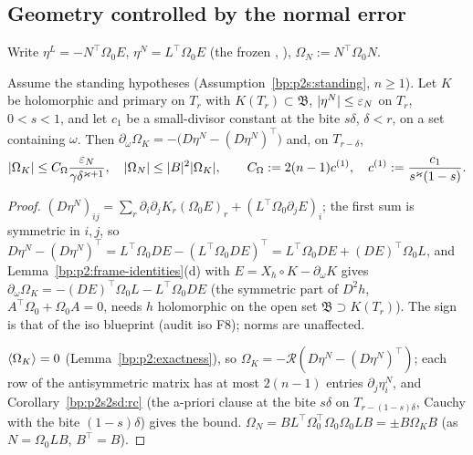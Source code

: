 \subsection{Geometry controlled by the normal error}\label{bp:p2s2:sec-geo}

Write $\eta^L=-N^\top\Omega_0E$, $\eta^N=L^\top\Omega_0E$ (the frozen , ), $\Omega_N:=N^\top\Omega_0N$.

\begin{lemma}\label{bp:p2s2:omega}
Assume the standing hypotheses (Assumption~\ref{bp:p2s:standing}, $n\ge1$). Let $K$ be holomorphic and primary on $T_r$ with $K(T_r)\subset\mathfrak B$,
$\lvert \eta^N\rvert\le\varepsilon_N$ on $T_r$, $0<s<1$, and let $c_1$ be a small-divisor constant at the bite $s\delta$, $\delta<r$, on a set containing
$\omega$. Then $\partial_\omega\Omega_K=-\bigl(D\eta^N-(D\eta^N)^\top\bigr)$ and, on $T_{r-\delta}$,
\[
\lvert \Omega_K\rvert\le C_\Omega\frac{\varepsilon_N}{\gamma\delta^{\varkappa+1}},\quad\lvert \Omega_N\rvert\le\lvert B\rvert^2\lvert \Omega_K\rvert,\qquad C_\Omega:=2(n-1)c^{(1)},\quad
c^{(1)}:=\frac{c_1}{s^\varkappa(1-s)}.
\]
\end{lemma}

\begin{proof}
\label{step:p2s2:om-id}
$(D\eta^N)_{ij}=\sum_r\partial_i\partial_jK_r(\Omega_0E)_r+(L^\top\Omega_0\partial_jE)_i$; the first sum is symmetric in $i,j$, so
$D\eta^N-(D\eta^N)^\top=L^\top\Omega_0DE-(L^\top\Omega_0DE)^\top=L^\top\Omega_0DE+(DE)^\top\Omega_0L$, and Lemma~\ref{bp:p2:frame-identities}(d) with
$E=X_h\circ K-\partial_\omega K$ gives $\partial_\omega\Omega_K=-(DE)^\top\Omega_0L-L^\top\Omega_0DE$ (the symmetric part of $D^2h$, $A^\top\Omega_0+\Omega_0A=0$,
needs $h$ holomorphic on the open set $\mathfrak B\supset K(T_r)$). The sign is that of the iso blueprint (audit iso F8); norms are unaffected.

\label{step:p2s2:om-b}
$\langle \Omega_K\rangle=0$ (Lemma~\ref{bp:p2:exactness}), so $\Omega_K=-\mathcal R(D\eta^N-(D\eta^N)^\top)$; each row of the antisymmetric matrix has at most
$2(n-1)$ entries $\partial_j\eta^N_i$, and Corollary~\ref{bp:p2s2sd:rc} (the a-priori clause at the bite $s\delta$ on $T_{r-(1-s)\delta}$, Cauchy with the
bite $(1-s)\delta$) gives the bound. $\Omega_N=BL^\top\Omega_0^\top\Omega_0\Omega_0LB=\pm B\Omega_KB$ (as $N=\Omega_0LB$, $B^\top=B$).
\end{proof}

